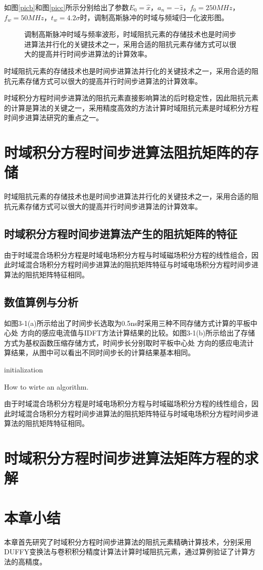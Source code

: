 \documentclass{standalone}
\begin{document}
如图\ref{picb}和图\ref{picc}所示分别给出了参数$E_0=\hat{x}$，$a_n=-\hat{z}$，$f_0=250MHz$，$f_w=50MHz$，$t_w=4.2\sigma$时，调制高斯脉冲的时域与频域归一化波形图。

\begin{figure}[h]
	\caption{调制高斯脉冲时域与频率波形，时域阻抗元素的存储技术也是时间步进算法并行化的关键技术之一，采用合适的阻抗元素存储方式可以很大的提高并行时间步进算法的计算效率。}
	\label{fig1}
\end{figure}
时域阻抗元素的存储技术也是时间步进算法并行化的关键技术之一，采用合适的阻抗元素存储方式可以很大的提高并行时间步进算法的计算效率。

时域积分方程时间步进算法的阻抗元素直接影响算法的后时稳定性，因此阻抗元素的计算是算法的关键之一，采用精度高效的方法计算时域阻抗元素是时域积分方程时间步进算法研究的重点之一。

\section{时域积分方程时间步进算法阻抗矩阵的存储}
时域阻抗元素的存储技术也是时间步进算法并行化的关键技术之一，采用合适的阻抗元素存储方式可以很大的提高并行时间步进算法的计算效率。

\subsection{时域积分方程时间步进算法产生的阻抗矩阵的特征}
由于时域混合场积分方程是时域电场积分方程与时域磁场积分方程的线性组合，因此时域混合场积分方程时间步进算法的阻抗矩阵特征与时域电场积分方程时间步进算法的阻抗矩阵特征相同。

\subsection{数值算例与分析}

如图3-1(a)所示给出了时间步长选取为0.5ns时采用三种不同存储方式计算的平板中心处 方向的感应电流值与IDFT方法计算结果的比较。如图3-1(b)所示给出了存储方式为基权函数压缩存储方式，时间步长分别取时平板中心处 方向的感应电流计算结果，从图中可以看出不同时间步长的计算结果基本相同。

\begin{algorithm}[H]
	initialization\;
\caption{How to wirte an algorithm.}
\end{algorithm}

由于时域混合场积分方程是时域电场积分方程与时域磁场积分方程的线性组合，因此时域混合场积分方程时间步进算法的阻抗矩阵特征与时域电场积分方程时间步进算法的阻抗矩阵特征相同。

\section{时域积分方程时间步进算法矩阵方程的求解}

\section{本章小结}
本章首先研究了时域积分方程时间步进算法的阻抗元素精确计算技术，分别采用DUFFY变换法与卷积积分精度计算法计算时域阻抗元素，通过算例验证了计算方法的高精度。
\end{document}
